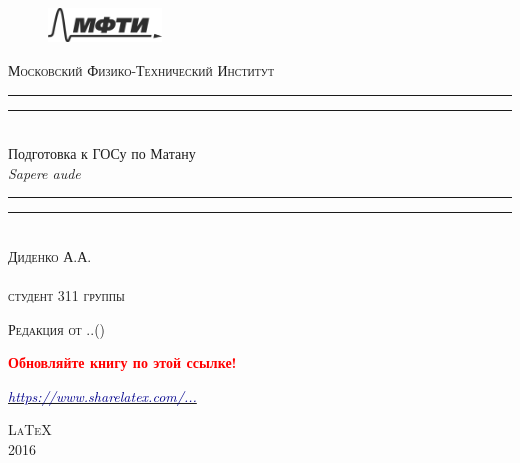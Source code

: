 \begin{titlepage}
\centering
\settowidth{\unitlength}{\LARGE\scshape Московский Физико-Технический Институт}

\begin{figure}[!h]
\center
\includegraphics[width=0.27\textwidth]{pictures/MIPT2}
\end{figure}
\vspace*{\baselineskip}
{\LARGE\scshape Московский Физико-Технический Институт}\\[\baselineskip]
\rule{\unitlength}{1.6pt}\vspace*{-\baselineskip}\vspace*{2pt}
\rule{\unitlength}{0.4pt}\\[1.8\baselineskip]
{\Huge Подготовка к ГОСу по Матану}\\[\baselineskip]
{\large \itshape Sapere aude}\\[0.7\baselineskip]
\rule{\unitlength}{0.4pt}\vspace*{-\baselineskip}\vspace{3.2pt}
\rule{\unitlength}{1.6pt}\\[\baselineskip]
{\Large\scshape Диденко А.А. \\ $ $\\студент 311 группы}\par
\vspace*{5\baselineskip}  




{\LARGE\scshape Редакция от \twodigit\day.\twodigit\month.\the\year \;(\currenttime)}\par %

\mbox{}

\textcolor{red}{\huge \textbf{Обновляйте книгу по этой ссылке!}}

\mbox{}

\href{https://www.sharelatex.com/github/repos/DidenkoAndre/GOS_book/builds/latest/output.pdf}{\large \textcolor{darkblue}{\textit{https://www.sharelatex.com/...}}}

\vfill
{\LARGE\scshape \LaTeX}\\[\baselineskip]
{\LARGE\scshape 2016}\par
\restoregeometry
\end{titlepage}
